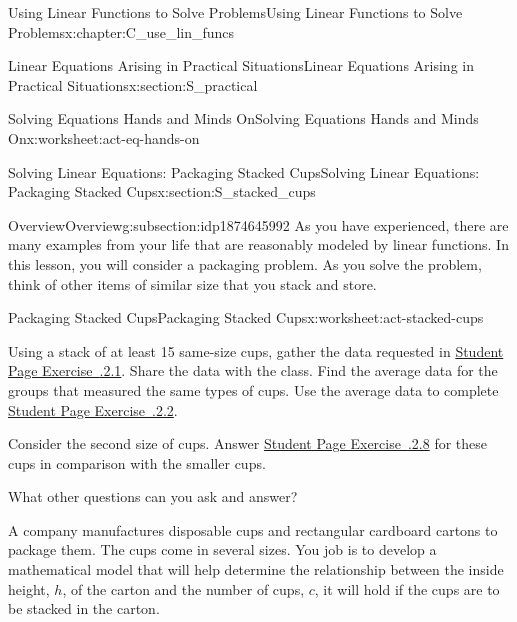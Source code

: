 \documentclass[oneside,10pt,]{book}
\newcommand{\xreffont}{\relax}
\numberwithin{equation}{chapter}
\begin{document}
\begin{chapterptx}{Using Linear Functions to Solve Problems}{}{Using Linear Functions to Solve Problems}{}{}{x:chapter:C_use_lin_funcs}
\begin{sectionptx}{Linear Equations Arising in Practical Situations}{}{Linear Equations Arising in Practical Situations}{}{}{x:section:S_practical}
\begin{worksheet-subsection}{Solving Equations \textemdash{} Hands and Minds On}{}{Solving Equations \textemdash{} Hands and Minds On}{}{}{x:worksheet:act-eq-hands-on}
\end{worksheet-subsection}
\restoregeometry
\end{sectionptx}
%
%
\typeout{************************************************}
\typeout{************************************************}
%
\begin{sectionptx}{Solving Linear Equations: Packaging Stacked Cups}{}{Solving Linear Equations: Packaging Stacked Cups}{}{}{x:section:S_stacked_cups}
%
%
\typeout{************************************************}
\typeout{************************************************}
%
\begin{subsectionptx}{Overview}{}{Overview}{}{}{g:subsection:idp1874645992}
As you have experienced, there are many examples from your life that are reasonably modeled by linear functions. In this lesson, you will consider a packaging problem. As you solve the problem, think of other items of similar size that you stack and store.%
\end{subsectionptx}
%
%
\typeout{************************************************}
\typeout{************************************************}
%
\begin{worksheet-subsection}{Packaging Stacked Cups}{}{Packaging Stacked Cups}{}{}{x:worksheet:act-stacked-cups}
\begin{introduction}{}%
Using a stack of at least 15 same-size cups, gather the data requested in \hyperlink{x:exercise:exer-cups-table}{Student Page Exercise~{\xreffont 3.2.2.1}}. Share the data with the class. Find the average data for the groups that measured the same types of cups. Use the average data to complete \hyperlink{x:exercise:exer-cups-graph}{Student Page Exercise~{\xreffont 3.2.2.2}\textendash{}{\xreffont 3.2.2.7}}.%
\par
Consider the second size of cups. Answer \hyperlink{x:exercise:exer-cups-large}{Student Page Exercise~{\xreffont 3.2.2.8}} for these cups in comparison with the smaller cups.%
\par
What other questions can you ask and answer?%
\par
A company manufactures disposable cups and rectangular cardboard cartons to package them. The cups come in several sizes. You job is to develop a mathematical model that will help determine the relationship between the inside height, \(h\), of the carton and the number of cups, \(c\), it will hold if the cups are to be stacked in the carton.%

\end{introduction}
\end{worksheet-subsection}
\end{sectionptx}
\end{chapterptx}
\end{document}
